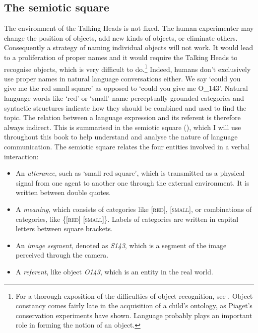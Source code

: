 \subsection{The semiotic square}

The environment of the Talking Heads is 
not fixed. The human experimenter 
may change the position of objects, add new kinds of 
objects, or eliminate
others. Consequently a strategy of naming individual objects
will not work. It would lead to a proliferation of 
proper names and it would require the Talking Heads to
recognise objects, which is very difficult to do.\footnote{
For a thorough exposition of the difficulties of 
object recognition, see \cite{Ullman:1996}. 
Object constancy comes fairly late in the 
acquisition of a child's ontology, as Piaget's conservation
experiments have shown. Language probably plays an important
role in forming the notion of an object.}
Indeed, humans don't exclusively use proper names in 
natural language conversations 
either. We say `could you give me the red small square' as 
opposed to `could you give me O\_143'. Natural language 
words like `red' or `small' name perceptually grounded categories
and syntactic structures indicate how they should
be combined and used to find the topic. The relation between 
a language expression and its referent is therefore 
always indirect. This is summarised
in the semiotic square (), which I will use throughout this book to 
help understand and analyse the nature of language communication. 
The semiotic square relates the four entities
involved in a verbal interaction: 
\begin{itemize}
\item An {\itshape utterance}, such as `small red square', which is 
transmitted as a physical 
signal from one agent to another one through the 
external environment. It is written between double quotes. 
\item A {\itshape meaning}, which consists of categories like [\textsc{red}], [\textsc{small}], 
or combinations of categories, like \{[\textsc{red}] [\textsc{small}]\}. Labels of 
categories are written in capital letters between 
square brackets. 
\item An {\itshape image segment}, denoted as \emph{S143}, which is 
a segment of the image perceived through the camera.
\item A {\itshape referent}, like object \emph{O143}, which is 
an entity in the real world. 
\end{itemize}


